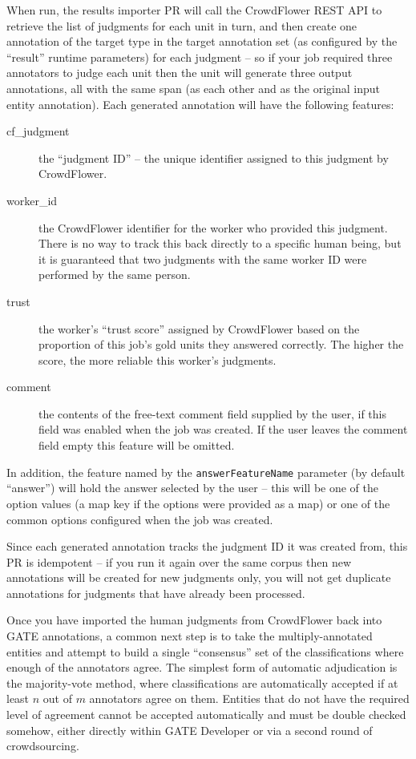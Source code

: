 When run, the results importer PR will call the CrowdFlower REST API to
retrieve the list of judgments for each unit in turn, and then create one
annotation of the target type in the target annotation set (as configured by
the ``result'' runtime parameters) for each judgment -- so if your job required
three annotators to judge each unit then the unit will generate three output
annotations, all with the same span (as each other and as the original input
entity annotation).  Each generated annotation will have the following
features:
\begin{description}
\item[cf\_judgment] the ``judgment ID'' -- the unique identifier assigned to
  this judgment by CrowdFlower.
\item[worker\_id] the CrowdFlower identifier for the worker who provided this
  judgment.  There is no way to track this back directly to a specific human
  being, but it is guaranteed that two judgments with the same worker ID were
  performed by the same person.
\item[trust] the worker's ``trust score'' assigned by CrowdFlower based on the
  proportion of this job's gold units they answered correctly.  The higher the
  score, the more reliable this worker's judgments.
\item[comment] the contents of the free-text comment field supplied by the
  user, if this field was enabled when the job was created.  If the user leaves
  the comment field empty this feature will be omitted.
\end{description}

In addition, the feature named by the \verb!answerFeatureName! parameter (by
default ``answer'') will hold the answer selected by the user -- this will be
one of the option values (a map key if the options were provided as a map) or
one of the common options configured when the job was created.

Since each generated annotation tracks the judgment ID it was created from,
this PR is idempotent -- if you run it again over the same corpus then new
annotations will be created for new judgments only, you will not get duplicate
annotations for judgments that have already been processed.



Once you have imported the human judgments from CrowdFlower back into GATE
annotations, a common next step is to take the multiply-annotated entities and
attempt to build a single ``consensus'' set of the classifications where enough
of the annotators agree.  The simplest form of automatic adjudication is the
majority-vote method, where classifications are automatically accepted if at
least $n$ out of $m$ annotators agree on them.  Entities that do not have the
required level of agreement cannot be accepted automatically and must be double
checked somehow, either directly within GATE Developer or via a second round of
crowdsourcing.

